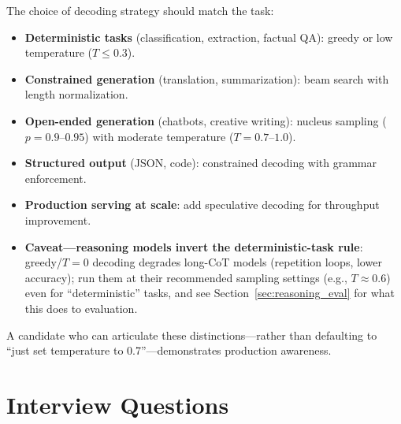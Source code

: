 \begin{keyinsight}
The choice of decoding strategy should match the task:
\begin{itemize}
    \item \textbf{Deterministic tasks} (classification, extraction, factual QA):
          greedy or low temperature ($T \leq 0.3$).
    \item \textbf{Constrained generation} (translation, summarization): beam
          search with length normalization.
    \item \textbf{Open-ended generation} (chatbots, creative writing): nucleus
          sampling ($p = 0.9\text{--}0.95$) with moderate temperature
          ($T = 0.7\text{--}1.0$).
    \item \textbf{Structured output} (JSON, code): constrained decoding with
          grammar enforcement.
    \item \textbf{Production serving at scale}: add speculative decoding for
          throughput improvement.
    \item \textbf{Caveat---reasoning models invert the deterministic-task
          rule}: greedy/$T{=}0$ decoding degrades long-CoT models (repetition
          loops, lower accuracy); run them at their recommended sampling
          settings (e.g., $T \approx 0.6$) even for ``deterministic'' tasks,
          and see Section~\ref{sec:reasoning_eval} for what this does to
          evaluation.
\end{itemize}
A candidate who can articulate these distinctions---rather than defaulting to
``just set temperature to 0.7''---demonstrates production awareness.
\end{keyinsight}

\section{Interview Questions}
\label{sec:eval_interview_questions}

\vspace{0.5em}

